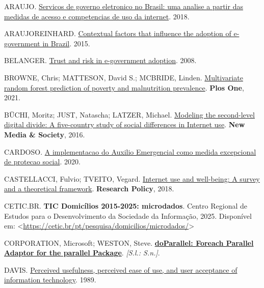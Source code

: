 \documentclass[
  man,
  floatsintext,
  longtable,
  a4paper,
  nolmodern,
  notxfonts,
  notimes,
  colorlinks=true,linkcolor=blue,citecolor=blue,urlcolor=blue]{apa7}
\newlength{\cslhangindent}
\newenvironment{CSLReferences}[2] %
 {\begin{list}{}{%
  \setlength{\itemindent}{0pt}
  \setlength{\leftmargin}{0pt}
  \setlength{\parsep}{0pt}
  \ifodd #1
   \setlength{\leftmargin}{\cslhangindent}
   \setlength{\itemindent}{-1\cslhangindent}
  \fi
  \setlength{\itemsep}{#2\baselineskip}}}
 {\end{list}}
\begin{document}
\protect{}\label{refs}
\begin{CSLReferences}{0}{1}
ARAUJO. \href{https://doi.org/10.1590/0034-7612171925}{Servicos de
governo eletronico no Brasil: uma analise a partir das medidas de acesso
e competencias de uso da internet}. 2018.

ARAUJOREINHARD. \href{https://doi.org/10.5700/rege579}{Contextual
factors that influence the adoption of e-government in Brazil}. 2015.

BELANGER. \href{https://doi.org/10.1016/j.jsis.2007.12.002}{Trust and
risk in e-government adoption}. 2008.

BROWNE, Chris; MATTESON, David S.; MCBRIDE, Linden.
\href{https://doi.org/10.1371/journal.pone.0255519}{Multivariate random
forest prediction of poverty and malnutrition prevalence}. \textbf{Plos
One}, 2021.

BÜCHI, Moritz; JUST, Natascha; LATZER, Michael.
\href{https://doi.org/10.1177/1461444815604154}{Modeling the
second-level digital divide: A five-country study of social differences
in Internet use}. \textbf{New Media \& Society}, 2016.

CARDOSO. \href{https://doi.org/10.1590/0034-761220200267}{A
implementacao do Auxilio Emergencial como medida excepcional de protecao
social}. 2020.

CASTELLACCI, Fulvio; TVEITO, Vegard.
\href{https://doi.org/10.1016/j.respol.2017.11.007}{Internet use and
well-being: A survey and a theoretical framework}. \textbf{Research
Policy}, 2018.

CETIC.BR. \textbf{{TIC} {D}omicílios 2015-2025: microdados}. Centro
Regional de Estudos para o Desenvolvimento da Sociedade da Informação,
2025. Disponível em:
\textless{}\url{https://cetic.br/pt/pesquisa/domicilios/microdados/}\textgreater{}

CORPORATION, Microsoft; WESTON, Steve.
\textbf{\href{https://github.com/RevolutionAnalytics/doparallel}{doParallel:
Foreach Parallel Adaptor for the parallel Package}}. \emph{{[}S.l.:
S.n.{]}}.

DAVIS. \href{https://doi.org/10.2307/249008}{Perceived usefulness,
perceived ease of use, and user acceptance of information technology}.
1989.


\end{CSLReferences}
\end{document}

